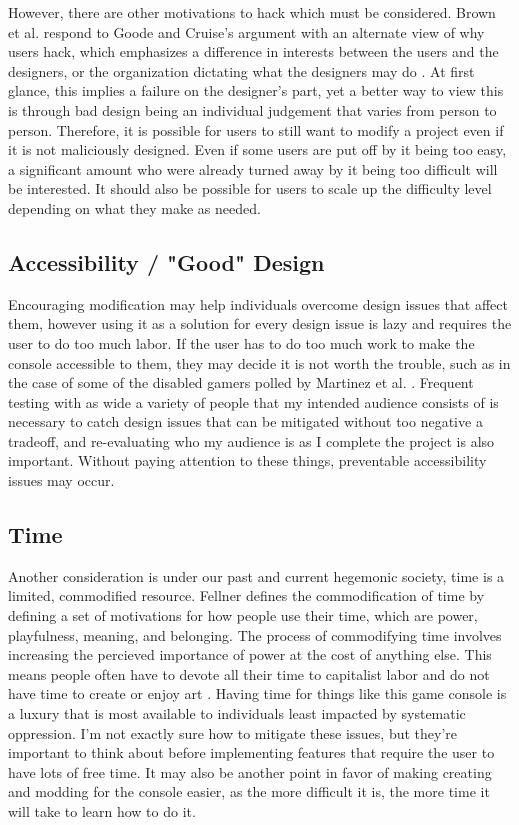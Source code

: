 \documentclass[10pt,twocolumn]{article}
\begin{document}
However, there are other motivations to hack which must be considered.
Brown et al. respond to Goode and Cruise's argument with an alternate view of
why users hack, which emphasizes a difference in interests between the users and
the designers, or the organization dictating what the designers may do
\cite{brown_why_2022}. At first glance, this implies a failure on the designer's
part, yet a better way to view this is through bad design being an individual
judgement that varies from person to person. Therefore, it is possible for users
to still want to modify a project even if it is not maliciously designed.
Even if some users are put off by it being too easy, a significant amount who
were already turned away by it being too difficult will be interested. It should
also be possible for users to scale up the difficulty level depending on what
they make as needed.

\subsection{Accessibility / "Good" Design}

Encouraging modification may help individuals overcome design issues that affect
them, however using it as a solution for every design issue is lazy and requires
the user to do too much labor. If the user has to do too much work to make the
console accessible to them, they may decide it is not worth the trouble, such as
in the case of some of the disabled gamers polled by Martinez et al.
\cite{martinez_playing_2024}. Frequent testing with as wide a variety of people
that my intended audience consists of is necessary to catch design issues that
can be mitigated without too negative a tradeoff, and re-evaluating who my
audience is as I complete the project is also important. Without paying
attention to these things, preventable accessibility issues may occur.

\subsection{Time}

Another consideration is under our past and current hegemonic society, time is a
limited, commodified resource. Fellner defines the commodification of time by
defining a set of motivations for how people use their time, which are power,
playfulness, meaning, and belonging. The process of commodifying time involves
increasing the percieved importance of power at the cost of anything else. This
means people often have to devote all their time to capitalist labor and do not
have time to create or enjoy art \cite{fellner_value_2017}. Having time for
things like this game console is a luxury that is most available to individuals
least impacted by systematic oppression. I'm not exactly sure how to mitigate
these issues, but they're important to think about before implementing features
that require the user to have lots of free time. It may also be another point in
favor of making creating and modding for the console easier, as the more
difficult it is, the more time it will take to learn how to do it.
\end{document}
